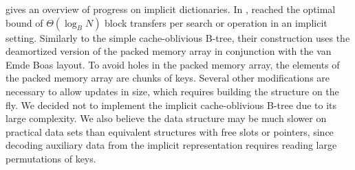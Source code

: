 \cite{implicit-btrees-survey} gives an overview of progress on implicit
dictionaries.  In \citeyear{implicit-cob}, \citeauthor{implicit-cob} reached
the optimal bound of $\Theta(\log_B N)$ block transfers per search or operation
in an implicit setting. Similarly to the simple cache-oblivious B-tree, their
construction uses the deamortized version of the packed memory array
in conjunction with the van Emde Boas layout. To avoid holes in the packed
memory array, the elements of the packed memory array are chunks of keys.
Several other modifications are necessary to allow updates in size, which
requires building the structure on the fly.
We decided not to implement the implicit cache-oblivious B-tree due
to its large complexity. We also believe the data structure may be much
slower on practical data sets than equivalent structures with free slots or
pointers, since decoding auxiliary data from the implicit representation
requires reading large permutations of keys.
